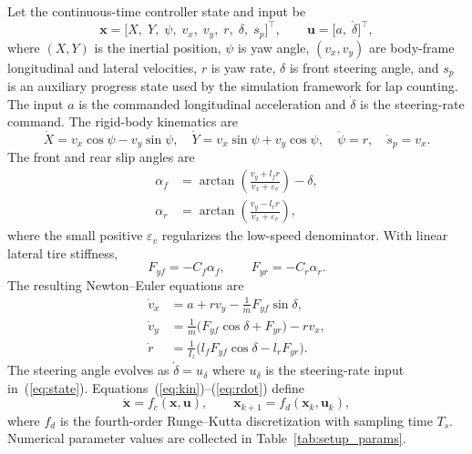 \documentclass{iopjournal}
\begin{document}
Let the continuous-time controller state and input be
\begin{equation}
\bm{x}=\bigl[X,\;Y,\;\psi,\;v_x,\;v_y,\;r,\;\delta,\;s_p\bigr]^\top,\qquad
\bm{u}=\bigl[a,\;\dot\delta\bigr]^\top ,
\label{eq:state}
\end{equation}
where $(X,Y)$ is the inertial position, $\psi$ is yaw angle, $(v_x,v_y)$ are
body-frame longitudinal and lateral velocities, $r$ is yaw rate, $\delta$ is
front steering angle, and $s_p$ is an auxiliary progress state used by
the simulation framework for lap counting.  The input $a$ is the commanded longitudinal
acceleration and $\dot\delta$ is the steering-rate command.  The rigid-body
kinematics are
\begin{equation}
\dot X=v_x\cos\psi-v_y\sin\psi,\quad
\dot Y=v_x\sin\psi+v_y\cos\psi,\quad
\dot\psi=r,\quad \dot s_p=v_x .
\label{eq:kin}
\end{equation}
The front and rear slip angles are
\begin{align}
\alpha_f &= \arctan\!\left(\frac{v_y+l_f r}{v_x+\varepsilon_v}\right)-\delta,
\label{eq:alphaf}\\
\alpha_r &= \arctan\!\left(\frac{v_y-l_r r}{v_x+\varepsilon_v}\right),
\label{eq:alphar}
\end{align}
where the small positive $\varepsilon_v$ regularizes the low-speed
denominator.  With linear lateral tire stiffness,
\begin{equation}
F_{yf}=-C_f\alpha_f,\qquad F_{yr}=-C_r\alpha_r .
\label{eq:tire}
\end{equation}
The resulting Newton--Euler equations are
\begin{align}
\dot v_x &= a+r v_y-\frac{1}{m}F_{yf}\sin\delta,
\label{eq:vxdot}\\
\dot v_y &= \frac{1}{m}\bigl(F_{yf}\cos\delta+F_{yr}\bigr)-r v_x,
\label{eq:vydot}\\
\dot r &= \frac{1}{I_z}\bigl(l_fF_{yf}\cos\delta-l_rF_{yr}\bigr).
\label{eq:rdot}
\end{align}
The steering angle evolves as $\dot\delta=u_\delta$ where $u_\delta$ is the
steering-rate input in~(\ref{eq:state}).
Equations~(\ref{eq:kin})--(\ref{eq:rdot}) define
\begin{equation}
\dot{\bm{x}}=f_c(\bm{x},\bm{u}),\qquad
\bm{x}_{k+1}=f_d(\bm{x}_k,\bm{u}_k),
\label{eq:fd}
\end{equation}
where $f_d$ is the fourth-order Runge--Kutta discretization with sampling
time $T_s$.  Numerical parameter values are collected in
Table~\ref{tab:setup_params}.
\end{document}
